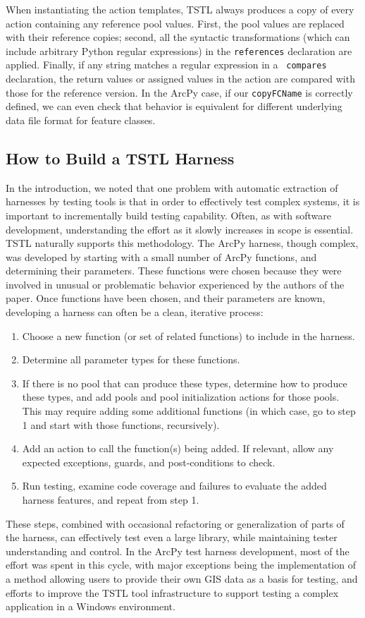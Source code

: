When instantiating the action templates, TSTL always produces a copy
of every action containing any reference pool values.  First, the pool
values are replaced with their reference copies; second, all the
syntactic transformations (which can include arbitrary Python regular
expressions) in the {\tt references} declaration are applied.
Finally, if any string matches a regular expression in a {\tt
  compares} declaration, the return values or assigned values in the
action are compared with those for the reference version.  In the
ArcPy case, if our {\tt copyFCName} is correctly defined, we can even
check that behavior is equivalent for different underlying data file
format for feature classes.

\subsection{How to Build a TSTL Harness}

In the introduction, we noted that one problem with automatic
extraction of harnesses by testing tools is that in order to effectively test
complex systems, it is important to incrementally build testing
capability.  Often, as with software development, understanding the
effort as it slowly increases in scope is essential.  TSTL
naturally supports this methodology.  The ArcPy harness, though
complex, was developed by starting with a small number of ArcPy
functions, and determining their parameters.  These functions were
chosen because they were involved in unusual or problematic behavior
experienced by the authors of the paper.  Once
functions have been chosen, and their parameters are known,
developing a harness can often be a clean, iterative process:

\begin{enumerate}
\item Choose a new function (or set of related functions) to include
  in the harness.
\item Determine all parameter types for these functions.
\item If there is no pool that can produce these types, determine how
  to produce these types, and add pools and pool initialization actions for
  those pools.  This may require adding some additional
  functions (in which case, go to step 1 and start with those
  functions, recursively).
\item Add an action to call the function(s) being added.  If relevant,
  allow any expected exceptions, guards, and post-conditions to check.
\item Run testing, examine code coverage and failures to evaluate the
  added harness features, and repeat from step 1.
\end{enumerate}

These steps, combined with occasional refactoring or generalization of
parts of the harness, can effectively test even a large library, while
maintaining tester understanding and control.   In the ArcPy test
harness development, most of the effort was spent in this cycle, with
major exceptions being the implementation of a method allowing users
to provide their own GIS data as a basis for testing, and efforts to
improve the TSTL tool infrastructure to support testing a complex
application in a Windows environment.